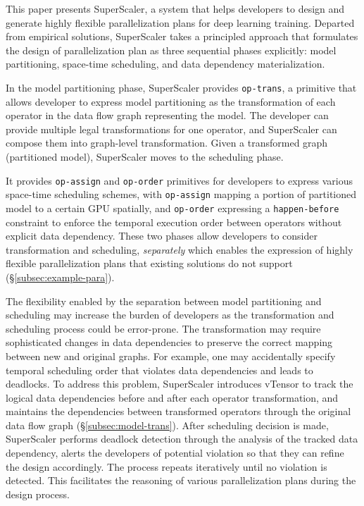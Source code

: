 This paper presents {SuperScaler}, a system that helps developers to design and generate highly flexible parallelization plans for deep learning training. Departed from empirical solutions, {SuperScaler} takes a principled approach that formulates the design of parallelization plan as three sequential phases explicitly: model partitioning, space-time scheduling, and data dependency materialization. 

In the model partitioning phase, {SuperScaler} provides \texttt{op-trans}, a primitive that allows developer to express model partitioning as the transformation of each operator in the data flow graph representing the model. The developer can provide multiple legal transformations for one operator, and {SuperScaler} can compose them into graph-level transformation. Given a transformed graph (partitioned model), {SuperScaler} moves to the scheduling phase. 

It provides \texttt{op-assign} and \texttt{op-order} primitives for developers to express various space-time scheduling schemes, with \texttt{op-assign} mapping a portion of partitioned model to a certain GPU spatially, and \texttt{op-order} expressing a \texttt{happen-before} constraint to enforce the temporal execution order between operators without explicit data dependency. These two phases allow developers to consider transformation and scheduling, \emph{separately} which enables the expression of highly flexible parallelization plans that existing solutions do not support (\S\ref{subsec:example-para}). 

The flexibility enabled by the separation between model partitioning and scheduling may increase the burden of developers as the transformation and scheduling process could be error-prone. The transformation may require sophisticated changes in data dependencies to preserve the correct mapping between new and original graphs. For example, one may accidentally specify temporal scheduling order that violates data dependencies and leads to deadlocks. To address this problem, {SuperScaler} introduces vTensor to track the logical data dependencies before and after each operator transformation, and maintains the dependencies between transformed operators through the original data flow graph (\S\ref{subsec:model-trans}). After scheduling decision is made, {SuperScaler} performs deadlock detection through the analysis of the tracked data dependency, alerts the developers of potential violation so that they can refine the design accordingly. The process repeats iteratively until no violation is detected. This facilitates the reasoning of various parallelization plans during the design process.  


